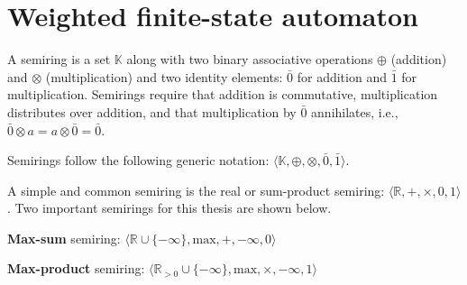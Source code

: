 \section{Weighted finite-state automaton}

\begin{definition}
  A semiring is a set $\mathbb{K}$ along with two binary associative operations $\oplus$ (addition) and $\otimes$ (multiplication) and two identity elements: $\bar{0}$ for addition and $\bar{1}$ for multiplication. Semirings require that addition is commutative, multiplication distributes over addition, and that multiplication by $\bar{0}$ annihilates, i.e., $\bar{0} \otimes a = a \otimes \bar{0} = \bar{0}$.

\begin{remark}
  Semirings follow the following generic notation: $\langle \mathbb{K}, \oplus, \otimes, \bar{0}, \bar{1} \rangle$.
\end{remark}

\begin{remark}
  A simple and common semiring is the real or sum-product semiring: $\langle \mathbb{R}, +, \times, 0, 1 \rangle$. Two important semirings for this thesis are shown below.
\end{remark}

\begin{remark}
  \textbf{Max-sum} semiring: $\langle \mathbb{R} \cup \{-\infty\}, \text{max}, +, -\infty, 0 \rangle$
\end{remark}

\begin{remark}
  \textbf{Max-product} semiring: $\langle \mathbb{R}_{>0} \cup \{-\infty\}, \text{max}, \times, -\infty, 1 \rangle$
\end{remark}

\end{definition}

